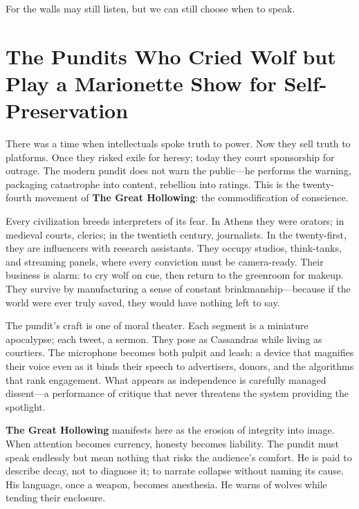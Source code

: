 \documentclass[11pt,twoside]{book}
\begin{document}
For the walls may still listen, but we can still choose when to speak.

%
\chapter{The Pundits Who Cried Wolf but Play a Marionette Show for Self-Preservation}
\label{ch:25}

There was a time when intellectuals spoke truth to power.  
Now they sell truth to platforms.  
Once they risked exile for heresy; today they court sponsorship for outrage.  
The modern pundit does not warn the public—he performs the warning, packaging catastrophe into content, rebellion into ratings.  
This is the twenty-fourth movement of \textbf{The Great Hollowing}: the commodification of conscience.

Every civilization breeds interpreters of its fear.  
In Athens they were orators; in medieval courts, clerics; in the twentieth century, journalists.  
In the twenty-first, they are influencers with research assistants.  
They occupy studios, think-tanks, and streaming panels, where every conviction must be camera-ready.  
Their business is alarm: to cry wolf on cue, then return to the greenroom for makeup.  
They survive by manufacturing a sense of constant brinkmanship—because if the world were ever truly saved, they would have nothing left to say.

The pundit’s craft is one of moral theater.  
Each segment is a miniature apocalypse; each tweet, a sermon.  
They pose as Cassandras while living as courtiers.  
The microphone becomes both pulpit and leash: a device that magnifies their voice even as it binds their speech to advertisers, donors, and the algorithms that rank engagement.  
What appears as independence is carefully managed dissent—a performance of critique that never threatens the system providing the spotlight.

\textbf{The Great Hollowing} manifests here as the erosion of integrity into image.  
When attention becomes currency, honesty becomes liability.  
The pundit must speak endlessly but mean nothing that risks the audience’s comfort.  
He is paid to describe decay, not to diagnose it; to narrate collapse without naming its cause.  
His language, once a weapon, becomes anesthesia.  
He warns of wolves while tending their enclosure.
\end{document}
